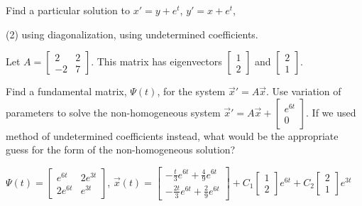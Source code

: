 \begin{exercise}\ansMark%
Find a particular solution to $x' = y + e^t$, $y' = x +e^t$,
\begin{tasks}(2)
\task using diagonalization,
\task using undetermined coefficients.
\end{tasks}
\end{exercise}

\begin{exercise}
Let $A=\displaystyle \begin{bmatrix}2&2\\-2&7\end{bmatrix}$. This matrix has eigenvectors $\displaystyle \begin{bmatrix} 1 \\ 2 \end{bmatrix}$ and $\displaystyle \begin{bmatrix} 2 \\ 1 \end{bmatrix}$.
\begin{tasks}
\task Find a fundamental matrix, $\Psi(t)$, for the system $\vec{x}'=A\vec{x}$.
\task Use variation of parameters to solve the non-homogeneous system $\vec{x}'=A\vec{x}+\displaystyle \begin{bmatrix}e^{6t} \\ 0 \end{bmatrix}$.
\task If we used method of undetermined coefficients instead, what would be the appropriate guess for the form of the non-homogeneous solution?
\end{tasks}
\end{exercise}
\comboSol{%
}
{%
$\Psi(t) = \left[\begin{smallmatrix} e^{6t} & 2e^{3t} \\ 2e^{6t} & e^{3t} \end{smallmatrix}\right]$, $\vec{x}(t) = \left[\begin{smallmatrix} -\frac{t}{3}e^{6t} + \frac{4}{9}e^{6t} \\ -\frac{2t}{3}e^{6t} + \frac{2}{9}e^{6t} \end{smallmatrix}\right] + C_1\left[\begin{smallmatrix} 1 \\ 2 \end{smallmatrix}\right]e^{6t} + C_2\left[\begin{smallmatrix} 2 \\ 1 \end{smallmatrix}\right]e^{3t}$
}

